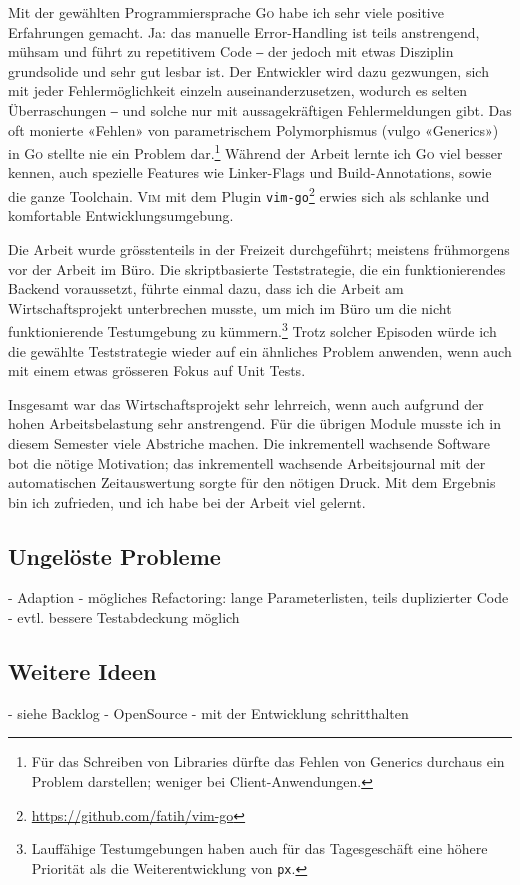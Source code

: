 Mit der gewählten Programmiersprache \textsc{Go} habe ich sehr viele positive Erfahrungen gemacht. Ja: das manuelle Error-Handling ist teils anstrengend, mühsam und führt zu repetitivem Code ‒ der jedoch mit etwas Disziplin grundsolide und sehr gut lesbar ist. Der Entwickler wird dazu gezwungen, sich mit jeder Fehlermöglichkeit einzeln auseinanderzusetzen, wodurch es selten Überraschungen ‒ und solche nur mit aussagekräftigen Fehlermeldungen gibt. Das oft monierte «Fehlen» von parametrischem Polymorphismus (vulgo «Generics») in \textsc{Go} stellte nie ein Problem dar.\footnote{Für das Schreiben von Libraries dürfte das Fehlen von Generics durchaus ein Problem darstellen; weniger bei Client-Anwendungen.} Während der Arbeit lernte ich \textsc{Go} viel besser kennen, auch spezielle Features wie Linker-Flags und Build-Annotations, sowie die ganze Toolchain. \textsc{Vim} mit dem Plugin \texttt{vim-go}\footnote{\url{https://github.com/fatih/vim-go}} erwies sich als schlanke und komfortable Entwicklungsumgebung.

Die Arbeit wurde grösstenteils in der Freizeit durchgeführt; meistens frühmorgens vor der Arbeit im Büro. Die skriptbasierte Teststrategie, die ein funktionierendes Backend voraussetzt, führte einmal dazu, dass ich die Arbeit am Wirtschaftsprojekt unterbrechen musste, um mich im Büro um die nicht funktionierende Testumgebung zu kümmern.\footnote{Lauffähige Testumgebungen haben auch für das Tagesgeschäft eine höhere Priorität als die Weiterentwicklung von \texttt{px}.} Trotz solcher Episoden würde ich die gewählte Teststrategie wieder auf ein ähnliches Problem anwenden, wenn auch mit einem etwas grösseren Fokus auf Unit Tests.

Insgesamt war das Wirtschaftsprojekt sehr lehrreich, wenn auch aufgrund der hohen Arbeitsbelastung sehr anstrengend. Für die übrigen Module musste ich in diesem Semester viele Abstriche machen. Die inkrementell wachsende Software bot die nötige Motivation; das inkrementell wachsende Arbeitsjournal mit der automatischen Zeitauswertung sorgte für den nötigen Druck. Mit dem Ergebnis bin ich zufrieden, und ich habe bei der Arbeit viel gelernt.

\subsection{Ungelöste Probleme}

- Adaption
- mögliches Refactoring: lange Parameterlisten, teils duplizierter Code
- evtl. bessere Testabdeckung möglich

\subsection{Weitere Ideen}

- siehe Backlog
- OpenSource
- mit der Entwicklung schritthalten

